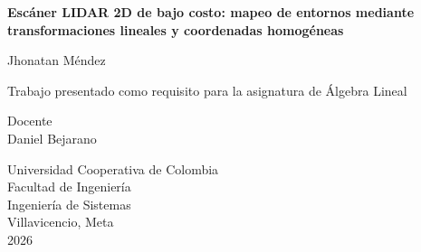 \newpage
\thispagestyle{empty}
\begin{center}

{\large\textbf{Escáner LIDAR 2D de bajo costo:
mapeo de entornos mediante transformaciones lineales
y coordenadas homogéneas}}

\vspace{2cm}

Jhonatan Méndez

\vspace{2cm}

Trabajo presentado como requisito para la asignatura de Álgebra Lineal

\vspace{2cm}

Docente\\
Daniel Bejarano

\vspace{2cm}

Universidad Cooperativa de Colombia\\
Facultad de Ingeniería\\
Ingeniería de Sistemas\\
Villavicencio, Meta\\
2026

\end{center}
\newpage
